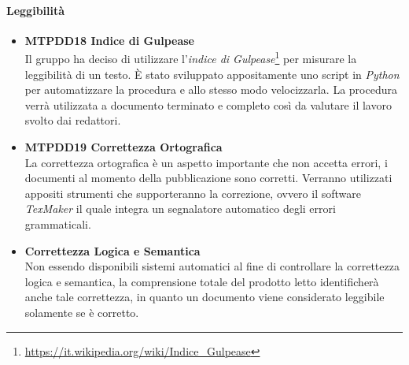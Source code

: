 \paragraph{Leggibilità}
\begin{itemize}
	\item \textbf{MTPDD18 Indice di Gulpease}\-\\
Il gruppo ha deciso di utilizzare l'\textit{indice di Gulpease}\glossario\footnote{\url{https://it.wikipedia.org/wiki/Indice\_Gulpease}} per misurare la leggibilità di un testo. È stato sviluppato appositamente uno script in \textit{Python} per automatizzare la procedura e allo stesso modo velocizzarla. La procedura verrà utilizzata a documento terminato e completo così da valutare il lavoro svolto dai redattori.

	\item \textbf{MTPDD19 Correttezza Ortografica}\-\\
La correttezza ortografica è un aspetto importante che non accetta errori, i documenti al momento della pubblicazione sono corretti. Verranno utilizzati appositi strumenti che supporteranno la correzione, ovvero il software \textit{TexMaker} il quale integra un segnalatore automatico degli errori grammaticali. 

	\item \textbf{Correttezza Logica e Semantica} \-\\
Non essendo disponibili sistemi automatici al fine di controllare la correttezza logica e semantica, la comprensione totale del prodotto letto identificherà anche tale correttezza, in quanto un documento viene considerato leggibile solamente se è corretto.
\end{itemize}

